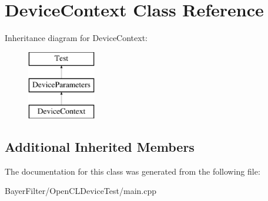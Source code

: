 \hypertarget{class_device_context}{\section{Device\-Context Class Reference}
\label{class_device_context}
}
Inheritance diagram for Device\-Context\-:\begin{figure}[H]
\begin{center}
\leavevmode
\includegraphics[height=3.000000cm]{class_device_context}
\end{center}
\end{figure}
\subsection*{Additional Inherited Members}


The documentation for this class was generated from the following file\-:\begin{DoxyCompactItemize}
\item 
Bayer\-Filter/\-Open\-C\-L\-Device\-Test/main.\-cpp\end{DoxyCompactItemize}
